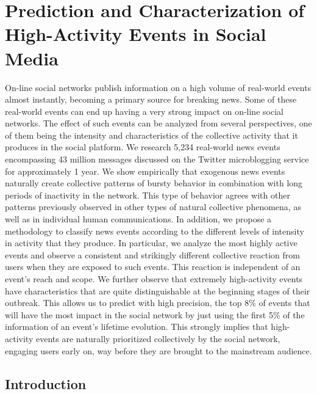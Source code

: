 \chapter{Prediction and Characterization of High-Activity Events
in Social Media}
\label{plos_chapter}
On-line social networks publish information on a high volume of
real-world events almost instantly, becoming a primary source for
breaking news.  Some of these real-world events can end up
having a very strong impact on on-line social networks.  The effect of such
events can be analyzed from several perspectives, one of them being
the intensity and characteristics of the collective activity that it
produces in the social platform.
We research 5,234 real-world news events encompassing 43 million
messages discussed on the Twitter microblogging service for
approximately 1 year.  We show empirically that exogenous news events
naturally create
collective patterns of bursty behavior in combination with long periods of
inactivity in the network. This type of behavior agrees with
other patterns previously observed in other types of natural collective phenomena, as
well as in individual human communications. In addition, we propose a methodology to
classify news events according to the different levels of intensity in
activity that they produce. In particular, we analyze the most
highly active events and 
observe a consistent and strikingly different collective reaction
from users when they are exposed to such events.  This reaction is
independent of an event's reach and scope.  We further observe that
extremely high-activity events have characteristics that are quite distinguishable
at the beginning stages of their outbreak.  This allows us to predict
with high precision, the top 8\% of events that will have the most
impact in the social network by just using the first 5\% of the information of an
event's lifetime evolution. This strongly implies that high-activity events
are naturally prioritized collectively by the social network, engaging users early
on, way before they are brought to the mainstream audience.


\section{Introduction}

